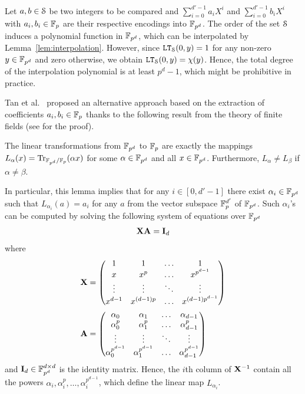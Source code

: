   Let $a,b \in \S$ be two integers to be compared and $\sum_{i=0}^{d'-1} a_i X^i$ and $\sum_{i=0}^{d'-1} b_i X^i$ with $a_i, b_i \in \F_p$ are their respective encodings into $\F_{p^d}$.
  The order of the set $\S$ induces a polynomial function in $\F_{p^d}$, which can be interpolated by Lemma~\ref{lem:interpolation}.
  However, since $\LT_\S(0,y) = 1$ for any non-zero $y \in \F_{p^d}$ and zero otherwise, we obtain $\LT_\S(0,y) = \chi(y)$.
  Hence, the total degree of the interpolation polynomial is at least $p^d-1$, 
  which might be prohibitive in practice.

  Tan et al.~\cite{TLWRK20} proposed an alternative approach based on the extraction of coefficients $a_i, b_i \in \F_p$ thanks to the following result from the theory of finite fields (see \cite[Theorem 2.24]{LN86} for the proof).
  \begin{lemma}\label{lem:extraction}
    The linear transformations from $\F_{p^d}$ to $\F_p$ are exactly the mappings $L_{\alpha}(x) = \Tr_{\F_{p^d}/\F_p}(\alpha x)$ for some $\alpha \in \F_{p^d}$ and all $x \in \F_{p^d}$.
    Furthermore, $L_{\alpha} \ne L_{\beta}$ if $\alpha \ne \beta$.
  \end{lemma}
  In particular, this lemma implies that for any $i \in [0,d'-1]$ there exist $\alpha_i \in \F_{p^d}$ such that $L_{\alpha_i}(a) = a_i$ for any $a$ from the vector subspace $\F_p^{d'}$ of $\F_{p^d}$.
  Such $\alpha_i$'s can be computed by solving the following system of equations over $\F_{p^d}$ 
  \begin{align*}
    \mX \mA
    =
    \mI_{d}
  \end{align*}
  where
  \begin{align*}
  \mX &= \begin{pmatrix}
      1       & 1       & \dots   & 1             \\
      x       & x^p     & \dots   & x^{p^{d-1}}   \\
      \vdots  & \vdots  & \ddots  & \vdots        \\
      x^{d-1}     & x^{(d-1)p}    & \dots   & x^{(d-1)p^{d-1}}  \\
    \end{pmatrix}
    \\
    \mA &= \begin{pmatrix}
      \alpha_0      & \alpha_1      & \dots   & \alpha_{d-1}      \\
      \alpha_0^{p}  & \alpha_1^{p}  & \dots   & \alpha_{d-1}^{p}  \\
      \vdots        & \vdots        & \ddots  & \vdots            \\
      \alpha_0^{p^{d-1}}  & \alpha_1^{p^{d-1}}  & \dots   & \alpha_{d-1}^{p^{d-1}}  \\
    \end{pmatrix}
  \end{align*}
  and $\mI_d \in \F_{p^d}^{d \times d}$ is the identity matrix.
  Hence, the $i$th column of $\inv{\mX}$ contain all the powers $\alpha_i, \alpha_i^p, \dots, \alpha_i^{p^{d-1}}$, which define the linear map $L_{\alpha_i}$.

